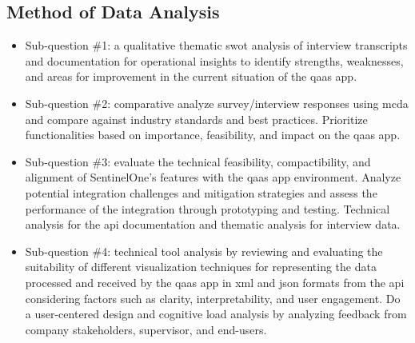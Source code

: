\begin{multicols}{2}
  \subsection{Method of Data Analysis}
  \begin{itemize}[label=-]
    \item Sub-question \#1: a qualitative thematic \acrshort{swot} analysis of interview transcripts
          and documentation for operational insights to identify strengths, weaknesses, and areas for
          improvement in the current situation of the \acrshort{qaas} app.
    \item Sub-question \#2: comparative analyze survey/interview responses using \acrshort{mcda} and
          compare against industry standards and best practices. Prioritize functionalities based on
          importance, feasibility, and impact on the \acrshort{qaas} app.
    \item Sub-question \#3: evaluate the technical feasibility, compactibility, and alignment of
          SentinelOne's features with the \acrshort{qaas} app environment. Analyze potential integration
          challenges and mitigation strategies and assess the performance of the integration through
          prototyping and testing. Technical analysis for the \acrshort{api} documentation and
          thematic analysis for interview data.
    \item Sub-question \#4: technical tool analysis by reviewing and evaluating the suitability of different
          visualization techniques for representing the data processed and received by the \acrshort{qaas}
          app in \acrshort{xml} and \acrshort{json} formats from the \acrshort{api} considering factors such
          as clarity, interpretability, and user engagement. Do a user-centered design and cognitive load
          analysis by analyzing feedback from company stakeholders, supervisor, and end-users.
  \end{itemize}

\end{multicols}

